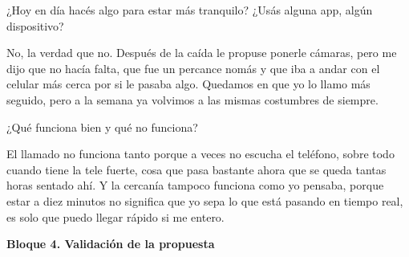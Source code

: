 \begin{description}[leftmargin=0cm, labelsep=0.5cm]

    \item[\textbf{Entrevistador:}] ¿Hoy en día hacés algo para estar más tranquilo?
    ¿Usás alguna app, algún dispositivo?

    \item[\textbf{Entrevistado:}] No, la verdad que no.
    Después de la caída le propuse ponerle cámaras, pero me dijo que no hacía falta, que fue un percance nomás y que iba a andar con el celular más cerca por si le pasaba algo.
    Quedamos en que yo lo llamo más seguido, pero a la semana ya volvimos a las mismas costumbres de siempre.

    \item[\textbf{Entrevistador:}] ¿Qué funciona bien y qué no funciona?

    \item[\textbf{Entrevistado:}] El llamado no funciona tanto porque a veces no escucha el teléfono, sobre todo cuando tiene la tele fuerte, cosa que pasa bastante ahora que se queda tantas horas sentado ahí.
    Y la cercanía tampoco funciona como yo pensaba, porque estar a diez minutos no significa que yo sepa lo que está pasando en tiempo real, es solo que puedo llegar rápido si me entero.

\end{description}

\bigskip
\textbf{Bloque 4. Validación de la propuesta}

